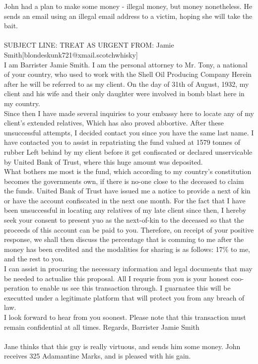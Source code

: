\documentclass{article}
\begin{document}
John had a plan to make some money {-} illegal money, but money nonetheless.
He sends an email using an illegal email address to a victim, hoping she will take the bait.
\\\\
SUBJECT LINE: TREAT AS URGENT
FROM: Jamie Smith[blondeskunk721@xmail.scotchwhisky]
\\
I am Barrister Jamie Smith.
I am the personal attorney to Mr. Tony, a national of your country, who used to work with the Shell Oil Producing Company
Herein after he will be referred to as my client.
On the day of 31th of August, 1932, my client and his wife and their only daughter were involved in bomb blast here in my country.
\\
Since then I have made several inquiries to your embassy here to locate any of my client's extended relatives, Which has also proved abbortive.
After these unsuccessful attempts, I decided contact you since you have the same last name.
I have contacted you to assist in repatriating the fund valued at 1579 tonnes of rubber Left behind by my client before it get confiscated or declared unservicable by United Bank of Trust, where this huge amount was deposited.
\\
What bothers me most is the fund, which according to my country's constitution becomes the governments own, if there is no{-}one close to the deceased to claim the funds.
United Bank of Trust have issued me a notice to provide a next of kin or have the account confiscated in the next one month.
For the fact that I have been unsuccessful in locating any relatives of my late client since then, I hereby seek your consent to present yuo as the next{-}of{-}kin to the deceased so that the proceeds of this account can be paid to you.
Therefore, on receipt of your positive response, we shall then discuss the percentage that is comming to me after the money has been credited and the modalities for sharing is as follows: 17\% to me, and the rest to you.
\\
I can assist in procuring the necessary information and legal documents that may be needed to actualise this proposal.
All I requrie from you is your honest coo{-}peration to enable us see this transaction through.
I guarnatee this will be executted under a legitimate platform that will protect you from any breach of law.
\\
I look forward to hear from you soonest.
Please note that this transaction must remain confidential at all times.
Regards, Barrister Jamie Smith
\\\\
Jane thinks that this guy is really virtuous, and sends him some money.
John receives 325 Adamantine Marks, and is pleased with his gain.
\end{document}
